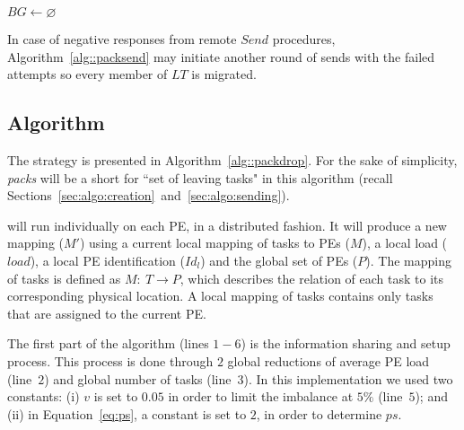 \begin{algorithm}[t]
    \DontPrintSemicolon
    $BG \gets \varnothing$ \\
    \caption{\batchsend}  
    \label{alg::packsend}
\end{algorithm}

In case of negative responses from remote $Send$ procedures, Algorithm~\ref{alg::packsend} may initiate another round of sends with the failed attempts so every member of $LT$ is migrated.

\subsection{\packdrop Algorithm} \label{sec:algo:main}

The \packdrop strategy is presented in Algorithm~\ref{alg::packdrop}.
For the sake of simplicity, \textit{packs} will be a short for ``set of leaving tasks" in this algorithm (recall Sections~\ref{sec:algo:creation}~and~\ref{sec:algo:sending}).

\packdrop will run individually on each PE, in a distributed fashion. 
It will produce a new mapping ($M'$) using a current local mapping of tasks to PEs ($M$), a local load ($load$), a local PE identification ($Id_l$) and the global set of PEs ($P$).
The mapping of tasks is defined as $M:\ T \rightarrow P$, which describes the relation of each task to its corresponding physical location.
A local mapping of tasks contains only tasks that are assigned to the current PE.

The first part of the algorithm (lines $1-6$) is the information sharing and setup process. 
This process is done through $2$ global reductions of average PE load (line~$2$) and global number of tasks (line~$3$).
In this implementation we used two constants: (i) $v$ is set to $0.05$ in order to limit the imbalance at $5\%$ (line~$5$); and (ii) in Equation~\ref{eq:ps}, a constant is set to $2$, in order to determine $ps$.

